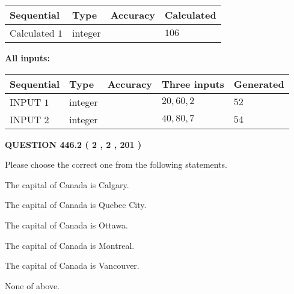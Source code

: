 \documentclass[12pt]{article}
\begin{document}
   
   
   
\noindent{}
   
   
  
  
\noindent\begin{tabular}{|l|l|l|l|}
\hline
 Sequential & Type & Accuracy & Calculated \\ 
\hline
 
 
  Calculated $  1 $ & integer &  & 
  $ 106 $ 
 \\  \hline  
 \end{tabular}
   
   
   
   
\noindent\vspace{0.1in}\hspace{-0.08in} {\textbf{\Large{All inputs: }}}
   
   
  
  
\noindent\begin{tabular}{|l|l|l|l|l|}
\hline
 Sequential & Type & Accuracy & Three inputs & Generated \\ 
\hline
 
 
  INPUT $  1 $ & integer &  & $
 20
 , 
 60
 , 
 2
 $ & $ 52 $ 
 \\  \hline  
 
 
  INPUT $  2 $ & integer &  & $
 40
 , 
 80
 , 
 7
 $ & $ 54 $ 
 \\  \hline  
 \end{tabular}
   
   
  
\vspace{0.2in}
  
{\textbf{\Large{QUESTION
446.2 
 ( 2 , 2 , 201 )
}}}
  
  
Please choose the correct one from the following statements.
 
 
The capital of Canada is Calgary.
 
 
The capital of Canada is Quebec City.
 
 
The capital of Canada is Ottawa.
 
 
The capital of Canada is Montreal.
 
 
The capital of Canada is Vancouver.
 
 
 None of above.
 
 
\noindent{}
 
\end{document}
